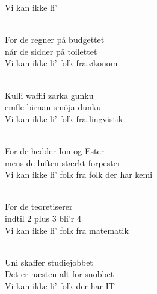 \begin{song}{Vi kan ikke li'}

  \begin{SBVerse}
    \\
    For de regner på budgettet\\
    når de sidder på toilettet\\
    Vi kan ikke li' folk fra økonomi
  \end{SBVerse}

  \begin{SBVerse}
    \\
    Kulli waffli zarka gunku\\
    emfle birnan smöja dunku\\
    Vi kan ikke li' folk fra lingvistik
  \end{SBVerse}

  \begin{SBVerse}
    \\
    For de hedder Ion og Ester\\
    mens de luften stærkt forpester\\
    Vi kan ikke li' folk fra folk der har kemi
  \end{SBVerse}

 \begin{SBVerse}
    \\
    For de teoretiserer\\
    indtil $2$ plus $3$ bli'r $4$\\
    Vi kan ikke li' folk fra matematik
  \end{SBVerse}

\begin{SBVerse}
   \\
   Uni skaffer studiejobbet\\
   Det er næsten alt for snobbet\\
   Vi kan ikke li' folk der har IT
 \end{SBVerse}



\end{song}
